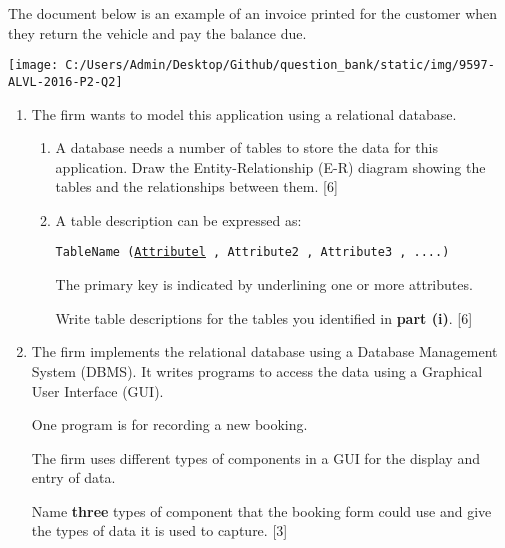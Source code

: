 The document below is an example of an invoice printed for the customer
when they return the vehicle and pay the balance due.
\begin{center}
\texttt{[image: C:/Users/Admin/Desktop/Github/question\_bank/static/img/9597-ALVL-2016-P2-Q2]}
\par\end{center}
\begin{enumerate}
\item The firm wants to model this application using a relational database.
\begin{enumerate}
\item A database needs a number of tables to store the data for this application.
Draw the Entity-Relationship (E-R) diagram showing the tables and
the relationships between them. \hfill{}{[}6{]}
\item A table description can be expressed as: 

\texttt{TableName (}\texttt{\uline{Attributel}}\texttt{ , Attribute2
, Attribute3 , ....) }

The primary key is indicated by underlining one or more attributes. 

Write table descriptions for the tables you identified in \textbf{part
(i)}. \hfill{}{[}6{]}
\end{enumerate}
\item The firm implements the relational database using a Database Management
System (DBMS). It writes programs to access the data using a Graphical
User Interface (GUI). 

One program is for recording a new booking. 

The firm uses different types of components in a GUI for the display
and entry of data. 

Name \textbf{three} types of component that the booking form could
use and give the types of data it is used to capture. \hfill{} {[}3{]}
\end{enumerate}